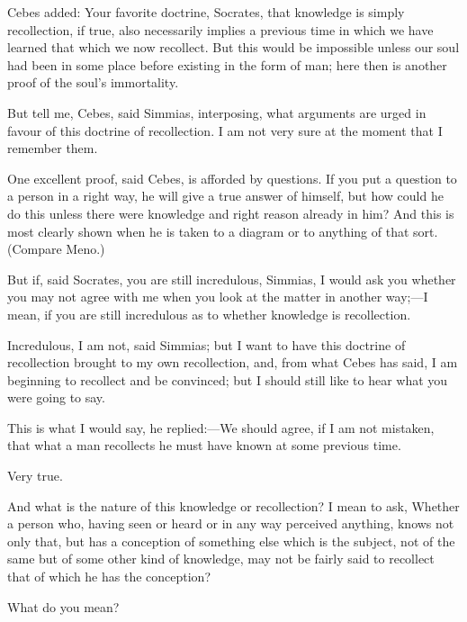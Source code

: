 \documentclass[11pt,letter]{article}
\begin{document}
\par  Cebes added: Your favorite doctrine, Socrates, that knowledge is simply recollection, if true, also necessarily implies a previous time in which we have learned that which we now recollect. But this would be impossible unless our soul had been in some place before existing in the form of man; here then is another proof of the soul's immortality.

\par  But tell me, Cebes, said Simmias, interposing, what arguments are urged in favour of this doctrine of recollection. I am not very sure at the moment that I remember them.

\par  One excellent proof, said Cebes, is afforded by questions. If you put a question to a person in a right way, he will give a true answer of himself, but how could he do this unless there were knowledge and right reason already in him? And this is most clearly shown when he is taken to a diagram or to anything of that sort. (Compare Meno.)

\par  But if, said Socrates, you are still incredulous, Simmias, I would ask you whether you may not agree with me when you look at the matter in another way;—I mean, if you are still incredulous as to whether knowledge is recollection.

\par  Incredulous, I am not, said Simmias; but I want to have this doctrine of recollection brought to my own recollection, and, from what Cebes has said, I am beginning to recollect and be convinced; but I should still like to hear what you were going to say.

\par  This is what I would say, he replied:—We should agree, if I am not mistaken, that what a man recollects he must have known at some previous time.

\par  Very true.

\par  And what is the nature of this knowledge or recollection? I mean to ask, Whether a person who, having seen or heard or in any way perceived anything, knows not only that, but has a conception of something else which is the subject, not of the same but of some other kind of knowledge, may not be fairly said to recollect that of which he has the conception?

\par  What do you mean?
\end{document}
